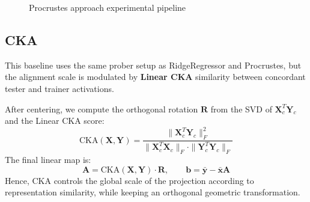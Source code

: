 \begin{figure}[t]
{%
}
    \caption{Procrustes approach experimental pipeline}
    \label{fig:procrustes-pipeline}
\end{figure}

\subsection{CKA}
This baseline uses the same prober setup as RidgeRegressor and Procrustes, but the alignment scale is modulated by \textbf{Linear CKA} similarity between concordant tester and trainer activations.

After centering, we compute the orthogonal rotation $\mathbf{R}$ from the SVD of $\mathbf{X}_c^T\mathbf{Y}_c$ and the Linear CKA score:
\begin{equation}
\label{eq:cka}
\mathrm{CKA}(\mathbf{X},\mathbf{Y}) =
\frac{\|\mathbf{X}_c^T\mathbf{Y}_c\|_F^2}
{\|\mathbf{X}_c^T\mathbf{X}_c\|_F\cdot\|\mathbf{Y}_c^T\mathbf{Y}_c\|_F}
\end{equation}
The final linear map is:
\begin{equation}
\label{eq:cka_map}
\mathbf{A} = \mathrm{CKA}(\mathbf{X},\mathbf{Y})\cdot\mathbf{R}, \qquad
\mathbf{b} = \bar{\mathbf{y}} - \bar{\mathbf{x}}\mathbf{A}
\end{equation}
Hence, CKA controls the global scale of the projection according to representation similarity, while keeping an orthogonal geometric transformation.

